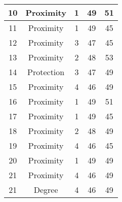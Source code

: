 \documentclass[results.tex]{subfiles}
\begin{document}
\begin{center}
\begin{tabular}{| c || c | c | c | c |}
            \hline
            10                      & Proximity                    & 1                      & 49                      & 51                   \\
            \hline
            11                      & Proximity                    & 1                      & 49                      & 45                   \\
            \hline
            12                      & Proximity                    & 3                      & 47                      & 45                   \\
            \hline
            13                      & Proximity                    & 2                      & 48                      & 53                   \\
            \hline
            14                      & Protection                   & 3                      & 47                      & 49                   \\
            \hline
            15                      & Proximity                    & 4                      & 46                      & 49                   \\
            \hline
            16                      & Proximity                    & 1                      & 49                      & 51                   \\
            \hline
            17                      & Proximity                    & 1                      & 49                      & 45                   \\
            \hline
            18                      & Proximity                    & 2                      & 48                      & 49                   \\
            \hline
            19                      & Proximity                    & 4                      & 46                      & 45                   \\
            \hline
            20                      & Proximity                    & 1                      & 49                      & 49                   \\
            \hline
            21                      & Proximity                    & 4                      & 46                      & 49                   \\
            \hline
            21                      & Degree                       & 4                      & 46                      & 49                   \\

\end{tabular}
\end{center}
\end{document}
